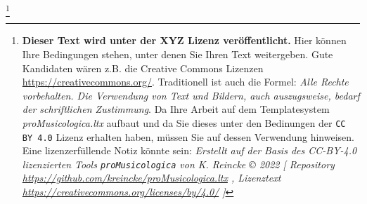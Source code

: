 
\footnote{\textbf{Dieser Text wird unter der XYZ Lizenz veröffentlicht.}
Hier können Ihre Bedingungen stehen, unter denen Sie Ihren Text weitergeben.
Gute Kandidaten wären z.B. die Creative Commons Lizenzen
\href{https://creativecommons.org/}{https://creativecommons.org/}. Traditionell ist auch die Formel: \emph{Alle Rechte vorbehalten. Die Verwendung von Text und Bildern, auch auszugsweise, bedarf der schriftlichen Zustimmung}. \newline
Da Ihre Arbeit auf dem Templatesystem \textit{proMusicologica.ltx} aufbaut und da Sie dieses unter den Bedinungen der \texttt{CC BY 4.0} Lizenz erhalten haben, müssen Sie auf dessen Verwendung hinweisen. Eine lizenzerfüllende Notiz könnte sein:
\newline
\textit{Erstellt auf der Basis des CC-BY-4.0 lizenzierten Tools \texttt{proMusicologica} von K. Reincke \copyright{} 2022 [
Repository \href{https://github.com/kreincke/proMusicologica.ltx}{https://github.com/kreincke/proMusicologica.ltx} ,
Lizenztext \href{https://creativecommons.org/licenses/by/4.0/}{https://creativecommons.org/licenses/by/4.0/} ]
}}
